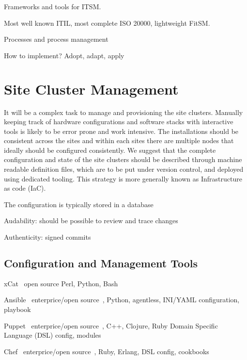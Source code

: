 \documentclass[12pt,a4paper]{article}
\begin{document}
Frameworks and tools for ITSM. 

Most well known ITIL, most complete ISO 20000, lightweight FitSM.

Processes and process management %

How to implement? Adopt, adapt, apply

\section{Site Cluster Management}

It will be a complex task to manage and provisioning the site
clusters. Manually keeping track of hardware configurations and
software stacks with interactive tools is likely to be error prone and
work intensive. The installations should be consistent across the
sites and within each sites there are multiple nodes that ideally
should be configured consistently. We suggest that the complete
configuration and state of the site clusters should be described
through machine readable definition files, which are to be put under
version control, and deployed using dedicated tooling. 
This strategy is more generally known as Infrastructure as code (IaC).

The configuration is typically stored in a database %

Audability: should be possible to review and trace changes

Authenticity: signed commits


\subsection{Configuration and Management Tools} \label{sec:config}


\bitm
\item xCat~\cite{xcat} open source  Perl, Python, Bash
\item Ansible~\cite{ansible} enterprice/open source~\cite{ansible-community}, Python, agentless, INI/YAML configuration, playbook~\cite{ansible-galaxy}
\item Puppet~\cite{puppet} enterprice/open source~\cite{puppet-osp},  C++, Clojure, Ruby Domain Specific Language (DSL) config, modules~\cite{puppet-forge}
\item Chef~\cite{chef} enterprice/open source~\cite{chef-infra}, Ruby, Erlang, DSL config, cookbooks~\cite{chef-cookbooks}
\eitm
\end{document}

